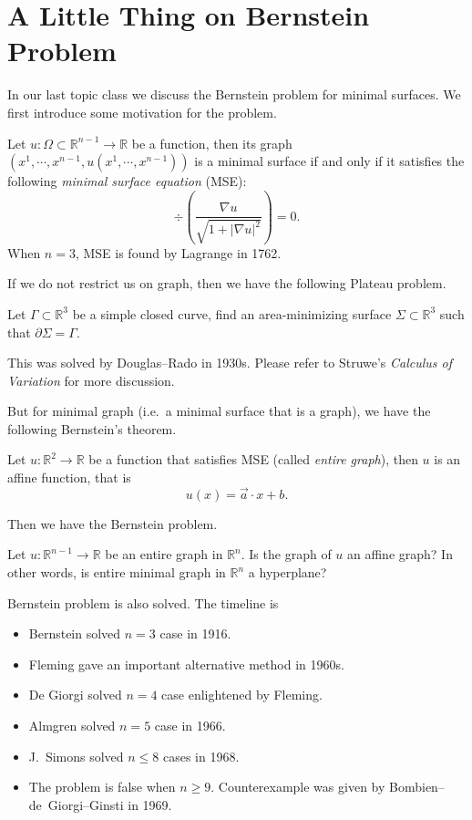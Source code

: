 \chapter{A Little Thing on Bernstein Problem}
In our last topic class we discuss the Bernstein problem for minimal surfaces.
We first introduce some motivation for the problem.

Let $u:\Omega\subset\mathbb{R}^{n-1}\to\mathbb{R}$ be a function, then its graph $(x^1,\cdots,x^{n-1},u(x^1,\cdots,x^{n-1}))$ is a minimal surface if and only if it satisfies the following \emph{minimal surface equation} (MSE):
\[\div\left(\frac{\nabla u}{\sqrt{1+|\nabla u|^2}}\right)=0.\]
When $n=3$, MSE is found by Lagrange in 1762.

If we do not restrict us on graph, then we have the following Plateau problem.
\begin{pro}[Plateau]
    Let $\Gamma\subset\mathbb{R}^3$ be a simple closed curve, find an area-minimizing surface $\Sigma\subset\mathbb{R}^3$ such that $\partial\Sigma=\Gamma$.
\end{pro}

This was solved by Douglas--Rado in 1930s.
Please refer to Struwe's \emph{Calculus of Variation} for more discussion.

But for minimal graph (i.e.\ a minimal surface that is a graph), we have the following Bernstein's theorem.
\begin{thm}[Bernstein, 1916]
    Let $u:\mathbb{R}^2\to\mathbb{R}$ be a function that satisfies MSE (called \emph{entire graph}), then $u$ is an affine function, that is
    \[u(x)=\vec{a}\cdot x+b.\]
\end{thm}

Then we have the Bernstein problem.
\begin{pro}[Bernstein]
    Let $u:\mathbb{R}^{n-1}\to\mathbb{R}$ be an entire graph in $\mathbb{R}^n$.
    Is the graph of $u$ an affine graph?
    In other words, is entire minimal graph in $\mathbb{R}^n$ a hyperplane?
\end{pro}

Bernstein problem is also solved.
The timeline is
\begin{itemize}
    \item Bernstein solved $n=3$ case in 1916.
    \item Fleming gave an important alternative method in 1960s.
    \item De Giorgi solved $n=4$ case enlightened by Fleming.
    \item Almgren solved $n=5$ case in 1966.
    \item J.\ Simons solved $n\leq 8$ cases in 1968.
    \item The problem is false when $n\geq 9$.
    Counterexample was given by Bombien--de~Giorgi--Ginsti in 1969.
\end{itemize}

